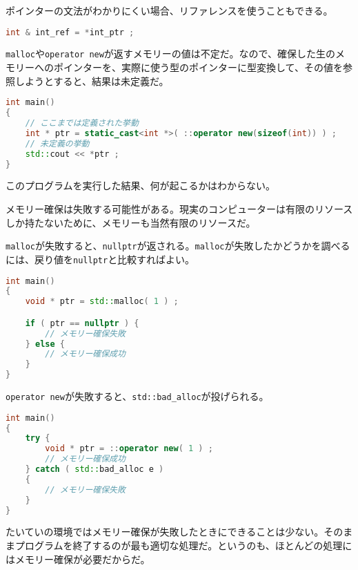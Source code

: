 ポインターの文法がわかりにくい場合、リファレンスを使うこともできる。

\begin{lstlisting}[language={C++}]
int & int_ref = *int_ptr ;
\end{lstlisting}

\texttt{malloc}や\texttt{operator new}が返すメモリーの値は不定だ。なので、確保した生のメモリーへのポインターを、実際に使う型のポインターに型変換して、その値を参照しようとすると、結果は未定義だ。

\begin{lstlisting}[language={C++}]
int main()
{
    // ここまでは定義された挙動
    int * ptr = static_cast<int *>( ::operator new(sizeof(int)) ) ;
    // 未定義の挙動
    std::cout << *ptr ;
}
\end{lstlisting}

このプログラムを実行した結果、何が起こるかはわからない。


メモリー確保は失敗する可能性がある。現実のコンピューターは有限のリソースしか持たないために、メモリーも当然有限のリソースだ。

\texttt{malloc}が失敗すると、\texttt{nullptr}が返される。\texttt{malloc}が失敗したかどうかを調べるには、戻り値を\texttt{nullptr}と比較すればよい。

\begin{lstlisting}[language={C++}]
int main()
{
    void * ptr = std::malloc( 1 ) ;

    if ( ptr == nullptr ) {
        // メモリー確保失敗
    } else {
        // メモリー確保成功
    }
}
\end{lstlisting}

\texttt{operator new}が失敗すると、\texttt{std::bad\_alloc}が投げられる。

\begin{lstlisting}[language={C++}]
int main()
{
    try {
        void * ptr = ::operator new( 1 ) ;
        // メモリー確保成功
    } catch ( std::bad_alloc e )
    {
        // メモリー確保失敗
    }
}
\end{lstlisting}

たいていの環境ではメモリー確保が失敗したときにできることは少ない。そのままプログラムを終了するのが最も適切な処理だ。というのも、ほとんどの処理にはメモリー確保が必要だからだ。

